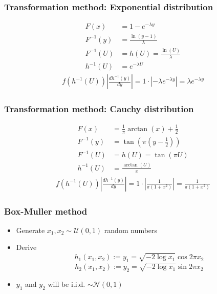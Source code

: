 \documentclass[10pt, serif, mathserif]{beamer}
\begin{document}
\begin{frame}
  \frametitle{Transformation method: Exponential distribution}
  \begin{align*}
    F(x) &= 1-e^{-\lambda y} \\
    F^{-1}(y) &= \frac{\ln(y - 1)}{\lambda} \\
    F^{-1}(U) &= h(U) = \frac{\ln(U)}{\lambda} \\
    h^{-1}(U) &= e^{-\lambda U}
  \end{align*} 
  \begin{align*}
    f(h^{-1}(U)) \left| \frac{dh^{-1}(y)}{dy}\right| = 1\cdot\left|-\lambda e^{-\lambda y}\right| 
                                                     = \lambda e^{-\lambda y}
  \end{align*}
\end{frame}
\begin{frame}
  \frametitle{Transformation method: Cauchy distribution}
  \begin{align*}
    F(x) &= \frac{1}{\pi} \arctan(x)+\frac{1}{2} \\
    F^{-1}(y) &= \tan\left(\pi\left(y - \frac{1}{2}\right)\right) \\
    F^{-1}(U) &= h(U) = \tan(\pi U) \\
    h^{-1}(U) &= \frac{\arctan(U)}{\pi}
  \end{align*} 
  \begin{align*}
    f(h^{-1}(U)) \left|\frac{dh^{-1}(y)}{dy}\right| = 1\cdot\left|\frac{1}{\pi(1+x^2)}\right|
                                                    = \frac{1}{\pi(1+x^2)}
  \end{align*}
\end{frame}

\begin{frame}
  \frametitle{Box-Muller method}
  \begin{itemize}
  	\item Generate $x_1, x_2 \sim \mathcal{U}(0,1)$ random numbers
  	\item Derive
  	  \[ h_1(x_1, x_2) := y_1 = \sqrt{-2 \log x_1} \cos{2\pi x_2} \]
  	  \[ h_2(x_1, x_2) := y_2 = \sqrt{-2 \log x_1} \sin{2\pi x_2} \] 
	\item $y_1$ and $y_2$ will be i.i.d. $\sim \mathcal{N}(0,1)$
  \end{itemize}
\end{frame}
\end{document}
